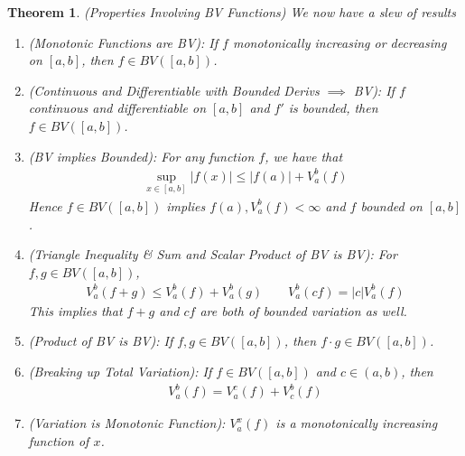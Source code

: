 \documentclass[12pt]{article}
\numberwithin{equation}{section} %
\theoremstyle{plain}
\newtheorem{thm}{Theorem}[section]
\theoremstyle{definition}
\theoremstyle{remark}
\begin{document}
\begin{thm}\emph{(Properties Involving BV Functions)}
We now have a slew of results
\begin{enumerate}[label=\emph{(\roman*)}]
  \item \emph{(Monotonic Functions are BV):}
    If $f$ monotonically increasing or decreasing on $[a,b]$, then $f\in
    BV([a,b])$.
  \item
    \emph{(Continuous and Differentiable with Bounded Derivs $\implies$ BV):}
    If $f$ continuous and differentiable on $[a,b]$ and $f'$ is bounded,
    then $f\in BV([a,b])$.
  \item \emph{(BV implies Bounded):}
    For any function $f$, we have that
    \begin{align}
      \sup_{x\in[a,b]} |f(x) | \leq |f(a)| + V_a^b(f)
      \label{bvbounded}
    \end{align}
    Hence $f\in BV([a,b])$ implies $f(a),V^b_a(f)<\infty$ and $f$
    bounded on $[a,b]$.

  \item
    \emph{(Triangle Inequality \& Sum and Scalar Product of BV is BV):}
    For $f, g\in BV([a,b])$,
    \begin{align*}
      V_a^b(f+g) \leq V_a^b(f) + V_a^b(g)
      \qquad V_a^b(cf) = |c|V_a^b(f)
    \end{align*}
    This implies that $f+g$ and $cf$ are both of bounded variation as
    well.

  \item \emph{(Product of BV is BV):}
    If $f,g\in BV([a,b])$, then $f\cdot g \in BV([a,b])$.

  \item \emph{(Breaking up Total Variation):}
    If $f\in BV([a,b])$ and $c \in (a,b)$, then
    \begin{align*}
      V_a^b(f) = V_a^c(f) + V_c^b(f)
    \end{align*}

  \item \emph{(Variation is Monotonic Function):}
    $V_a^x(f)$ is a monotonically increasing function of $x$.
\end{enumerate}
\end{thm}
\end{document}
